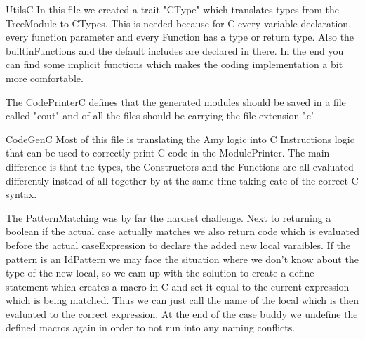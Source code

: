 UtilsC
In this file we created a trait "CType" which translates types from the TreeModule to CTypes. This is needed because for
C every variable declaration, every function parameter and every Function has a type or return type.
Also the builtinFunctions and the default includes are declared in there. In the end you can find some implicit functions
which makes the coding implementation a bit more comfortable.

The CodePrinterC defines that the generated modules should be saved in a file called "cout" and of all the files
should be carrying the file extension '.c'

CodeGenC
Most of this file is translating the Amy logic into C Instructions logic that can be used to correctly print C code in the
ModulePrinter. The main difference is that the types, the Constructors and the Functions are all evaluated differently
instead of all together by at the same time taking cate of the correct C syntax.

The PatternMatching was by far the hardest challenge. Next to returning a boolean if the actual case actually matches
we also return code which is evaluated before the actual caseExpression to declare the added new local varaibles.
If the pattern is an IdPattern we may face the situation where we don't know about the type of the new local,
so we cam up with the solution to create a define statement which creates a macro in C and set it equal to the current
expression which is being matched. Thus we can just call the name of the local which is then evaluated
to the correct expression. At the end of the case buddy we undefine the defined macros again in order to not run into any
naming conflicts.
